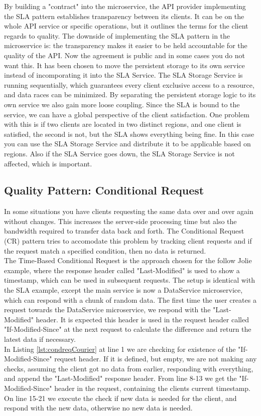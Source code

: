 \documentclass[12pt]{article}
\begin{document}
By building a "contract" into the microservice, the API provider implementing the SLA pattern establishes transparency between its clients. It can be on the whole API service or specific operations, but it outlines the terms for the client regards to quality. The downside of implementing the SLA pattern in the microservice is: the transparency makes it easier to be held accountable for the quality of the API. Now the agreement is public and in some cases you do not want this. It has been chosen to move the persistent storage to its own service instead of incomporating it into the SLA Service. The SLA Storage Service is running sequentially, which guarantees every client exclusive access to a resource, and data races can be minimized. By separating the persistent storage logic to its own service we also gain more loose coupling. Since the SLA is bound to the service, we can have a global perspective of the client satisfaction. One problem with this is if two clients are located in two distinct regions, and one client is satisfied, the second is not, but the SLA shows everything being fine. In this case you can use the SLA Storage Service and distribute it to be applicable based on regions. Also if the SLA Service goes down, the SLA Storage Service is not affected, which is important. 

\subsection{Quality Pattern: Conditional Request}
In some situations you have clients requesting the same data over and over again without changes. This increases the server-side processing time but also the bandwidth required to transfer data back and forth. The Conditional Request (CR) pattern tries to accomodate this problem by tracking client requests and if the request match a specified condition, then no data is returned. \\

The Time-Based Conditional Request \cite{CondReqMAPI} is the approach chosen for the follow Jolie example, where the response header called "Last-Modified" is used to show a timestamp, which can be used in subsequent requests. The setup is identical with the SLA example, except the main service is now a DataService microservice, which can respond with a chunk of random data. The first time the user creates a request towards the DataService microservice, we respond with the "Last-Modified" header. It is expected this header is used in the request header called "If-Modified-Since" \cite{CondReqRFC} at the next request to calculate the difference and return the latest data if necessary.\\
In Listing \ref{lst:condreqCourier} at line 1 we are checking for existence of the "If-Modified-Since" request header. If it is defined, but empty, we are not making any checks, assuming the client got no data from earlier, responding with everything, and append the "Last-Modified" response header. From line 8-13 we get the "If-Modified-Since" header in the request, containing the clients current timestamp. On line 15-21 we execute the check if new data is needed for the client, and respond with the new data, otherwise no new data is needed. 
\end{document}
